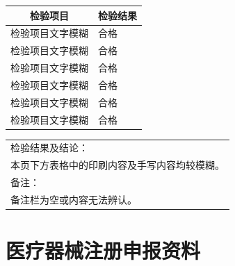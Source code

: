 \documentclass[UTF8,10pt,a4paper,fontset=fandol]{ctexart}
\newcommand{\fieldvalue}[1]{#1}
\newcommand{\handwritten}[1]{#1}
\newcommand{\TODO}[1]{#1}
\begin{document}
\vspace{0.5em}

\begin{tabularx}{\textwidth}{|X|l|}
\hline
\multicolumn{1}{|c|}{检验项目} & \multicolumn{1}{c|}{检验结果} \\ \hline
\TODO{检验项目文字模糊} &
\fieldvalue{\handwritten{合格}} \\ \hline
\TODO{检验项目文字模糊} &
\fieldvalue{\handwritten{合格}} \\ \hline
\TODO{检验项目文字模糊} &
\fieldvalue{\handwritten{合格}} \\ \hline
\TODO{检验项目文字模糊} &
\fieldvalue{\handwritten{合格}} \\ \hline
\TODO{检验项目文字模糊} &
\fieldvalue{\handwritten{合格}} \\ \hline
\TODO{检验项目文字模糊} &
\fieldvalue{\handwritten{合格}} \\ \hline
\end{tabularx}

\vspace{0.5em}

\begin{tabularx}{\textwidth}{|X|}
\hline
检验结果及结论： \\
\TODO{本页下方表格中的印刷内容及手写内容均较模糊。} \\ \hline
备注： \\
\TODO{备注栏为空或内容无法辨认。} \\ \hline
\end{tabularx}


\newpage

\section*{医疗器械注册申报资料}

\end{document}
